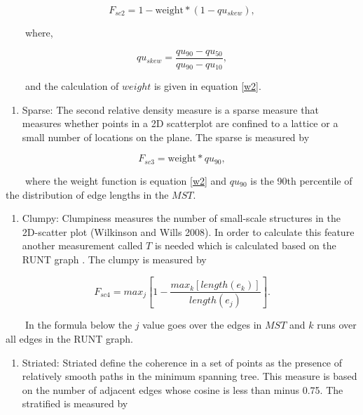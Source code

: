 \documentclass{article}
\newcommand{\tightlist}{%
\setlength{\itemsep}{0pt}\setlength{\parskip}{0pt}}
\begin{document}
\begin{equation}
    F_{sc2} = 1-\text{weight}*(1-qu_{skew}), 
\end{equation}

~~~~where,

\begin{equation}
    qu_{skew} = \frac{qu_{90}-qu_{50}}{qu_{90}-qu_{10}}, 
\end{equation}

~~~~and the calculation of \(weight\) is given in equation \ref{w2}.

\begin{enumerate}
\def\labelenumi{\roman{enumi})}
\setcounter{enumi}{2}
\tightlist
\item
  Sparse: The second relative density measure is a sparse measure that
  measures whether points in a 2D scatterplot are confined to a lattice
  or a small number of locations on the plane. The sparse is measured by
\end{enumerate}

\begin{equation}
   F_{sc3} = \text{weight} *qu_{90},
\end{equation}

~~~~where the weight function is equation \ref{w2} and \(qu_{90}\) is
the 90th percentile of the distribution of edge lengths in the \(MST\).



\begin{enumerate}
\def\labelenumi{\roman{enumi})}
\setcounter{enumi}{3}
\tightlist
\item
  Clumpy: Clumpiness measures the number of small-scale structures in
  the 2D-scatter plot (Wilkinson and Wills 2008). In order to calculate
  this feature another measurement called \(T\) is needed which is
  calculated based on the RUNT graph \citep{hartigan1992runt}. The clumpy
  is measured by
\end{enumerate}

\begin{equation}
    F_{sc4} = max_j[1-\frac{max_k[length(e_k)]}{length(e_j)}].
\end{equation}

~~~~In the formula below the \(j\) value goes over the edges in \(MST\)
and \(k\) runs over all edges in the RUNT graph.

\begin{enumerate}
\def\labelenumi{\alph{enumi})}
\setcounter{enumi}{21}
\tightlist
\item
  Striated: Striated define the coherence in a set of points as the
  presence of relatively smooth paths in the minimum spanning tree. This
  measure is based on the number of adjacent edges whose cosine is less
  than minus 0.75. The stratified is measured by
\end{enumerate}
\end{document}
